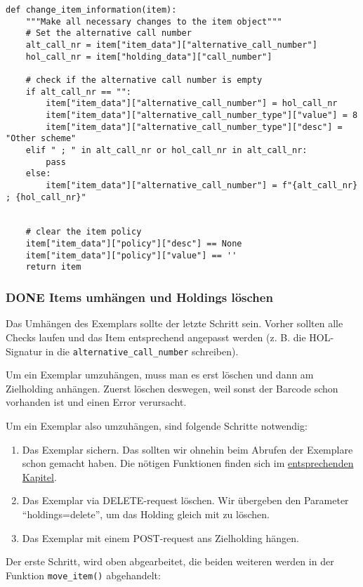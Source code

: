 \documentclass[10pt, a4paper]{scrartcl}
\begin{document}
\begin{enumerate}
\begin{verbatim}
def change_item_information(item):
    """Make all necessary changes to the item object"""
    # Set the alternative call number
    alt_call_nr = item["item_data"]["alternative_call_number"]
    hol_call_nr = item["holding_data"]["call_number"]

    # check if the alternative call number is empty
    if alt_call_nr == "":
        item["item_data"]["alternative_call_number"] = hol_call_nr
        item["item_data"]["alternative_call_number_type"]["value"] = 8
        item["item_data"]["alternative_call_number_type"]["desc"] = "Other scheme"
    elif " ; " in alt_call_nr or hol_call_nr in alt_call_nr:
        pass
    else:
        item["item_data"]["alternative_call_number"] = f"{alt_call_nr} ; {hol_call_nr}"


    # clear the item policy
    item["item_data"]["policy"]["desc"] == None
    item["item_data"]["policy"]["value"] == ''
    return item
\end{verbatim}
\end{enumerate}
\subsubsection{{\bfseries\sffamily DONE} Items umhängen und Holdings löschen}
\label{sec:org3df8fc4}
Das Umhängen des Exemplars sollte der letzte Schritt sein. Vorher sollten
alle Checks laufen und das Item entsprechend angepasst werden (z. B. die
HOL-Signatur in die \texttt{alternative\_call\_number} schreiben).

Um ein Exemplar umzuhängen, muss man es erst löschen und dann am
Zielholding anhängen. Zuerst löschen deswegen, weil sonst der Barcode
schon vorhanden ist und einen Error verursacht.

Um ein Exemplar also umzuhängen, sind folgende Schritte notwendig:
\begin{enumerate}
\item Das Exemplar sichern. Das sollten wir ohnehin beim Abrufen der
Exemplare schon gemacht haben. Die nötigen Funktionen finden sich im
\hyperref[sec:org8d236e8]{entsprechenden Kapitel}.
\item Das Exemplar via DELETE-request löschen. Wir übergeben den Parameter
"`holdings=delete"', um das Holding gleich mit zu löschen.
\item Das Exemplar mit einem POST-request ans Zielholding hängen.
\end{enumerate}

Der erste Schritt, wird oben abgearbeitet, die beiden weiteren werden in
der Funktion \texttt{move\_item()} abgehandelt:
\end{document}
